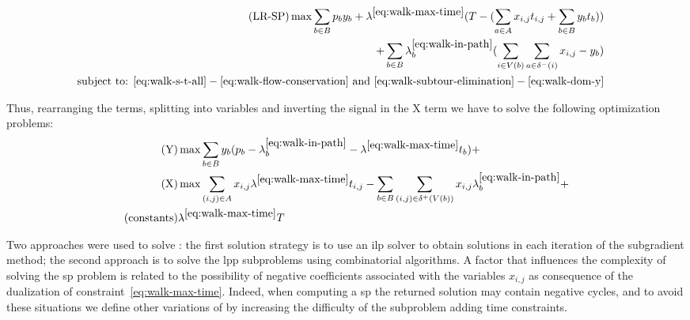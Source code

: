 \begin{align}
	\text{(LR-SP)}                                                                                                                                                \max \sum_{b \in B} p_{b} y_{b} + \lambda^{\ref{eq:walk-max-time}}_{}
	(T - (\sum_{a \in A} x_{i,j}t_{i,j} + \sum_{b \in B} y_b t_b))                                                                                                & \label{eq:lrsp-of}   \\
	\nonumber                                                                                                                                                     + \sum_{b \in B} \lambda^{\ref{eq:walk-in-path}}_{b}
	(\sum_{i \in V(b)} \sum_{a \in \delta^{-}(i)}x_{i,j} - y_b)                                                                                                   &                    & \\
	\nonumber \text{subject to: } \eqref{eq:walk-s-t-all}-\eqref{eq:walk-flow-conservation}\text{ and } \eqref{eq:walk-subtour-elimination}-\eqref{eq:walk-dom-y} &                    &
\end{align}


Thus, rearranging the terms, splitting into variables and inverting the signal in the X
term we have to solve the following optimization problems:
\begin{align}
	\text{(Y)}         & \max \sum_{b \in B} y_{b} (p_b - \lambda^{\ref{eq:walk-in-path}}_{b} - \lambda^{\ref{eq:walk-max-time}}_{} t_b) +                                                            \\
	\text{(X)}         & \max \sum_{(i,j) \in A} x_{i,j} \lambda^{\ref{eq:walk-max-time}}_{} t_{i,j} - \sum_{b \in B} \sum_{(i,j) \in \delta^{+}(V(b))} x_{i,j} \lambda^{\ref{eq:walk-in-path}}_{b} + \\
	\text{(constants)} & \lambda^{\ref{eq:walk-max-time}}_{} T
\end{align}

Two approaches were used to solve {\lrsp}:  the first solution strategy is to use
an \gls{ilp}  solver to obtain  solutions in  each iteration of  the subgradient
method;  the  second  approach  is  to solve  the  \gls{lpp}  subproblems  using
combinatorial  algorithms.  A factor  that  influences  the complexity  of
solving  the  \gls{sp}  problem  is  related  to  the  possibility  of  negative
coefficients associated  with the variables  $x_{i,j}$ as consequence  of the
dualization of constraint~\eqref{eq:walk-max-time}.  Indeed, when  computing a
\gls{sp} the returned  solution may contain negative cycles, and  to avoid these
situations we define other variations of {\lrsp} by increasing the difficulty
of the subproblem adding time constraints.


